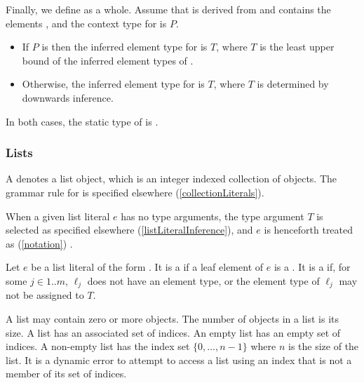 \documentclass[makeidx]{article}
\begin{document}
{
\vspace{3mm}
\EndCase

\LMHash{}%
Finally, we define
as a whole.
Assume that  is derived from 
and contains the elements ,
and the context type for  is $P$.

\begin{itemize}
\item
  If $P$ is \FreeContext{} then
  the inferred element type for  is $T$,
  where $T$ is the least upper bound of
  the inferred element types of .

\item
  Otherwise,
  the inferred element type for  is $T$,
  where $T$ is determined by downwards inference.
\end{itemize}

\LMHash{}%
In both cases, the static type of  is .


\subsubsection{Lists}

\LMHash{}%
A 
denotes a list object, which is an integer indexed collection of objects.
The grammar rule for  is specified elsewhere
(\ref{collectionLiterals}).

\LMHash{}%
When a given list literal $e$ has no type arguments,
the type argument $T$ is selected as specified elsewhere
(\ref{listLiteralInference}),
and $e$ is henceforth treated as
(\ref{notation})
.


\LMHash{}%
Let $e$ be a list literal of the form
.
It is a  if a leaf element of $e$ is a
.
It is a  if, for some $j \in 1 .. m$,
$\ell_j$ does not have an element type,
or the element type of $\ell_j$ may not be assigned to $T$.

\LMHash{}%
A list may contain zero or more objects.
The number of objects in a list is its size.
A list has an associated set of indices.
An empty list has an empty set of indices.
A non-empty list has the index set $\{0, \ldots, n - 1\}$
where $n$ is the size of the list.
It is a dynamic error to attempt to access a list
using an index that is not a member of its set of indices.

}
\end{document}
